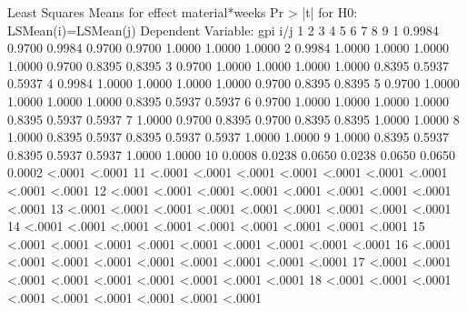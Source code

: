 \documentclass{article}
\begin{document}
\begin{Woutput}
                        Least Squares Means for effect material*weeks
                             Pr > |t| for H0: LSMean(i)=LSMean(j)
                                   Dependent Variable: gpi
i/j          1         2         3         4         5         6         7         8         9
   1              0.9984    0.9700    0.9984    0.9700    0.9700    1.0000    1.0000    1.0000
   2    0.9984              1.0000    1.0000    1.0000    1.0000    0.9700    0.8395    0.8395
   3    0.9700    1.0000              1.0000    1.0000    1.0000    0.8395    0.5937    0.5937
   4    0.9984    1.0000    1.0000              1.0000    1.0000    0.9700    0.8395    0.8395
   5    0.9700    1.0000    1.0000    1.0000              1.0000    0.8395    0.5937    0.5937
   6    0.9700    1.0000    1.0000    1.0000    1.0000              0.8395    0.5937    0.5937
   7    1.0000    0.9700    0.8395    0.9700    0.8395    0.8395              1.0000    1.0000
   8    1.0000    0.8395    0.5937    0.8395    0.5937    0.5937    1.0000              1.0000
   9    1.0000    0.8395    0.5937    0.8395    0.5937    0.5937    1.0000    1.0000
  10    0.0008    0.0238    0.0650    0.0238    0.0650    0.0650    0.0002    <.0001    <.0001
  11    <.0001    <.0001    <.0001    <.0001    <.0001    <.0001    <.0001    <.0001    <.0001
  12    <.0001    <.0001    <.0001    <.0001    <.0001    <.0001    <.0001    <.0001    <.0001
  13    <.0001    <.0001    <.0001    <.0001    <.0001    <.0001    <.0001    <.0001    <.0001
  14    <.0001    <.0001    <.0001    <.0001    <.0001    <.0001    <.0001    <.0001    <.0001
  15    <.0001    <.0001    <.0001    <.0001    <.0001    <.0001    <.0001    <.0001    <.0001
  16    <.0001    <.0001    <.0001    <.0001    <.0001    <.0001    <.0001    <.0001    <.0001
  17    <.0001    <.0001    <.0001    <.0001    <.0001    <.0001    <.0001    <.0001    <.0001
  18    <.0001    <.0001    <.0001    <.0001    <.0001    <.0001    <.0001    <.0001    <.0001


\end{Woutput}
\end{document}
